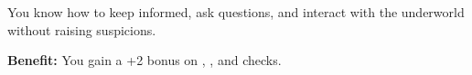 
You know how to keep informed, ask questions, and interact with the underworld without raising suspicions.

\textbf{Benefit:} You gain a +2 bonus on , , and  checks.